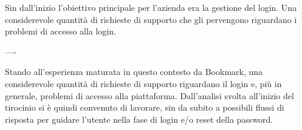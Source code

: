 Sin dall'inizio l'obiettivo principale per l'azienda era la gestione del login. 
%
Una considerevole quantità di richieste di supporto che gli pervengono riguardano i problemi di accesso alla login.
%




----


Stando all'esperienza maturata in questo contesto da Bookmark, una considerevole quantità di richieste di supporto riguardano il login e, più in generale, problemi di accesso alla piattaforma.
%
Dall'analisi svolta all'inizio del tirocinio si è quindi convenuto di lavorare, sin da subito a possibili flussi di risposta per guidare l'utente nella fase di login e/o reset della password. 
